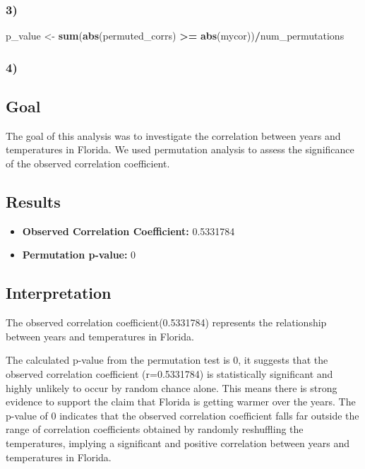 \documentclass[
]{article}
\newenvironment{Shaded}{\begin{snugshade}}{\end{snugshade}}
\newcommand{\FunctionTok}[1]{\textcolor[rgb]{0.13,0.29,0.53}{\textbf{#1}}}
\newcommand{\NormalTok}[1]{#1}
\newcommand{\OtherTok}[1]{\textcolor[rgb]{0.56,0.35,0.01}{#1}}
\newcommand{\SpecialCharTok}[1]{\textcolor[rgb]{0.81,0.36,0.00}{\textbf{#1}}}
\providecommand{\tightlist}{%
  \setlength{\itemsep}{0pt}\setlength{\parskip}{0pt}}
\begin{document}
\hypertarget{section-2}{%
\subsubsection{3)}\label{section-2}}

\begin{Shaded}
\begin{Highlighting}[]
\NormalTok{p\_value }\OtherTok{\textless{}{-}} \FunctionTok{sum}\NormalTok{(}\FunctionTok{abs}\NormalTok{(permuted\_corrs) }\SpecialCharTok{\textgreater{}=} \FunctionTok{abs}\NormalTok{(mycor))}\SpecialCharTok{/}\NormalTok{num\_permutations}
\end{Highlighting}
\end{Shaded}

\hypertarget{section-3}{%
\subsubsection{4)}\label{section-3}}

\hypertarget{goal}{%
\subsection{Goal}\label{goal}}

The goal of this analysis was to investigate the correlation between
years and temperatures in Florida. We used permutation analysis to
assess the significance of the observed correlation coefficient.

\hypertarget{results}{%
\subsection{Results}\label{results}}

\begin{itemize}
\tightlist
\item
  \textbf{Observed Correlation Coefficient:} 0.5331784
\item
  \textbf{Permutation p-value:} 0
\end{itemize}

\hypertarget{interpretation}{%
\subsection{Interpretation}\label{interpretation}}

The observed correlation coefficient(0.5331784) represents the
relationship between years and temperatures in Florida.

The calculated p-value from the permutation test is 0, it suggests that
the observed correlation coefficient (r=0.5331784) is statistically
significant and highly unlikely to occur by random chance alone. This
means there is strong evidence to support the claim that Florida is
getting warmer over the years. The p-value of 0 indicates that the
observed correlation coefficient falls far outside the range of
correlation coefficients obtained by randomly reshuffling the
temperatures, implying a significant and positive correlation between
years and temperatures in Florida.
\end{document}
